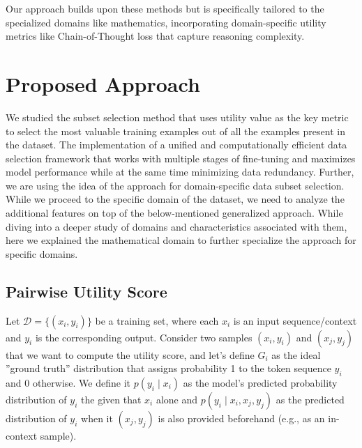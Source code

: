 \documentclass{article}
\begin{document}
Our approach builds upon these methods but is specifically tailored to the specialized domains like mathematics, incorporating domain-specific utility metrics like Chain-of-Thought loss that capture reasoning complexity.




\section{Proposed Approach}

We studied the subset selection method that uses utility value as the key metric to select the most valuable training examples out of all the examples present in the dataset. The implementation of a unified and computationally efficient data selection framework that works with multiple stages of fine-tuning and maximizes model performance while at the same time minimizing data redundancy. Further, we are using the idea of the approach for domain-specific data subset selection. While we proceed to the specific domain of the dataset, we need to analyze the additional features on top of the below-mentioned generalized approach. While diving into a deeper study of domains and characteristics associated with them, here we explained the mathematical domain to further specialize the approach for specific domains.

\subsection{Pairwise Utility Score}

Let $\mathcal{D} = \{(x_i, y_i)\}$ be a training set, where each $x_i$ is an input sequence/context and $y_i$ is the corresponding output. Consider two samples $(x_i, y_i)$ and $(x_j, y_j)$ that we want to compute the utility score, and let's define $G_i$ as the ideal ''ground truth'' distribution that assigns probability 1 to the token sequence $y_i$ and 0 otherwise. We define it $p(y_i \mid x_i)$ as the model’s predicted probability distribution of $y_i$ the given that $x_i$ alone and $p(y_i \mid x_i, x_j, y_j)$ as the predicted distribution of $y_i$ when it $(x_j, y_j)$ is also provided beforehand (e.g., as an in-context sample).
\end{document}
